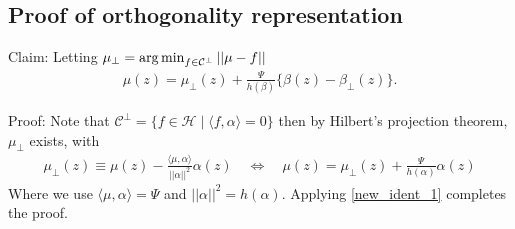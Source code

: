 \subsection{Proof of orthogonality representation}
\label{proof_of_ortho}

Claim: Letting $\mu_\perp = \operatorname*{arg\,min}_{f\in \mathcal{C}^{\perp}} ||\mu - f||$
\begin{align*}
    \mu(z) = \mu_{\perp}(z) + \frac{\Psi}{h(\beta)} \{\beta(z) - \beta_{\perp}(z)\}.
\end{align*}

Proof:
Note that $\mathcal{C}^\perp = \{f\in \mathcal{H} \mid  \langle f, \alpha \rangle = 0 \}$ then by Hilbert's projection theorem, $\mu_\perp$ exists, with
\begin{align*}
    \mu_\perp(z) \equiv \mu(z) - \frac{\langle \mu, \alpha \rangle}{||\alpha||^2} \alpha(z) 
    \quad\iff\quad \mu(z) = \mu_\perp(z) + \frac{\Psi}{h(\alpha)} \alpha(z) 
\end{align*}
Where we use $\langle \mu, \alpha \rangle = \Psi$ and $||\alpha||^2 = h(\alpha)$. Applying \eqref{new_ident_1} completes the proof.

